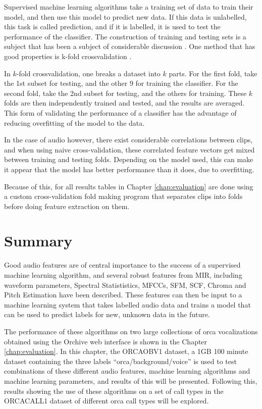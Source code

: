 \documentclass[12pt,oneside]{book}
\begin{document}
Supervised machine learning algorithms take a training set of data to
train their model, and then use this model to predict new data.  If
this data is unlabelled, this task is called prediction, and if it is
labelled, it is used to test the performance of the classifier.  The
construction of training and testing sets is a subject that has been a
subject of considerable discussion \cite{efron1983leisurely}.  One
method that has good properties is k-fold crossvalidation
\cite{kohavi1995study}.

In $k$-fold crossvalidation, one breaks a dataset into $k$ parts.  For
the first fold, take the 1st subset for testing, and the other 9 for
training the classifier.  For the second fold, take the 2nd subset for
testing, and the others for training.  These $k$ folds are then
independently trained and tested, and the results are averaged.  This
form of validating the performance of a classifier has the advantage
of reducing overfitting of the model to the data.

In the case of audio however, there exist considerable correlations
between clips, and when using naive cross-validation, these correlated
feature vectors get mixed between training and testing folds.
Depending on the model used, this can make it appear that the model
has better performance than it does, due to overfitting.  

Because of this, for all results tables in Chapter
\ref{chap:evaluation} are done using a custom cross-validation fold
making program that separates clips into folds before doing feature
extraction on them.

\section{Summary}

Good audio features are of central importance to the success of a
supervised machine learning algorithm, and several robust features
from MIR, including waveform parameters, Spectral Statististics,
MFCCs, SFM, SCF, Chroma and Pitch Estimation have been described.
These features can then be input to a machine learning system that
takes labelled audio data and trains a model that can be used to
predict labels for new, unknown data in the future.

The performance of these algorithms on two large collections of orca
vocalizations obtained using the Orchive web interface is shown in the
Chapter \ref{chap:evaluation}.  In this chapter, the ORCAOBV1 dataset,
a 1GB 100 minute dataset containing the three labels
``orca/background/voice'' is used to test combinations of these
different audio features, machine learning algorithms and machine
learning parameters, and results of this will be presented.  Following
this, results showing the use of these algorithms on a set of
\totalClipsInORCACALL call types in the ORCACALL1 dataset of
\totalCallsInORCACALL different orca call types will be explored.
\end{document}
